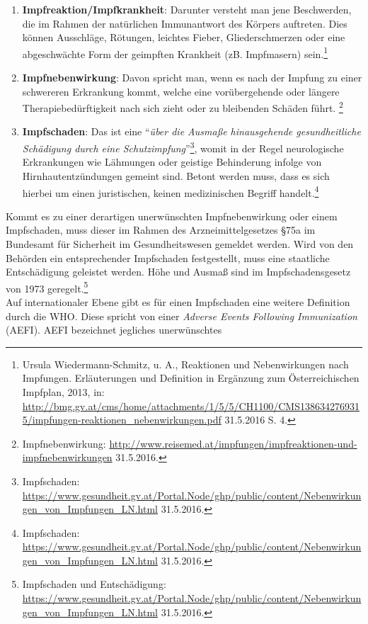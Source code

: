 \documentclass[
    a4paper,
    12pt,
    hyphens,
    chapterprefix=true,
    headheight=33pt,
    footheight=29pt,
    headings=optiontohead,
]{scrartcl}
\begin{document}
\begin{enumerate}
  \item{\textbf{Impfreaktion/Impfkrankheit}: Darunter versteht man jene Beschwerden, die im Rahmen der natürlichen Immunantwort des Körpers auftreten.
    Dies können Ausschläge, Rötungen, leichtes Fieber, Gliederschmerzen oder eine abgeschwächte Form der geimpften Krankheit
    (zB. Impfmasern) sein.\footnote{Ursula Wiedermann-Schmitz, u. A., Reaktionen und Nebenwirkungen nach Impfungen. Erläuterungen und Definition in
    Ergänzung zum Österreichischen Impfplan, 2013, in: \url{http://bmg.gv.at/cms/home/attachments/1/5/5/CH1100/CMS1386342769315/impfungen-reaktionen_nebenwirkungen.pdf} 31.5.2016 S. 4.}}
  \item{\textbf{Impfnebenwirkung}: Davon spricht man, wenn es nach der Impfung zu einer schwereren Erkrankung kommt, welche eine
    vorübergehende oder längere Therapiebedürftigkeit nach sich zieht oder zu bleibenden Schäden führt.
    \footnote{Impfnebenwirkung: \url{http://www.reisemed.at/impfungen/impfreaktionen-und-impfnebenwirkungen} 31.5.2016.}}
  \item{\textbf{Impfschaden}: Das ist eine "`\textit{über die Ausmaße hinausgehende gesundheitliche Schädigung durch eine
    Schutzimpfung}"'\footnote{Impfschaden: \url{https://www.gesundheit.gv.at/Portal.Node/ghp/public/content/Nebenwirkungen_von_Impfungen_LN.html} 31.5.2016.},
    womit in der Regel neurologische Erkrankungen wie Lähmungen oder geistige Behinderung infolge von Hirnhautentzündungen gemeint sind. Betont werden muss, dass es sich hierbei um einen juristischen, keinen medizinischen Begriff handelt.\footnote{Impfschaden: \url{https://www.gesundheit.gv.at/Portal.Node/ghp/public/content/Nebenwirkungen_von_Impfungen_LN.html} 31.5.2016.}}
\end{enumerate}
Kommt es zu einer derartigen unerwünschten Impfnebenwirkung oder einem Impfschaden, muss dieser im Rahmen des Arzneimittelgesetzes
§75a im Bundesamt für Sicherheit im Gesundheitswesen gemeldet werden. Wird von den Behörden ein
entsprechender Impfschaden festgestellt, muss eine staatliche Entschädigung geleistet werden.
Höhe und Ausmaß sind im Impfschadensgesetz von 1973 geregelt.\footnote{Impfschaden und Entschädigung: \url{https://www.gesundheit.gv.at/Portal.Node/ghp/public/content/Nebenwirkungen_von_Impfungen_LN.html} 31.5.2016.}\\
Auf internationaler Ebene gibt es für einen Impfschaden eine weitere Definition durch die WHO. Diese spricht von einer
\textit{Adverse Events Following Immunization} (AEFI). AEFI bezeichnet jegliches unerwünschtes
\end{document}
